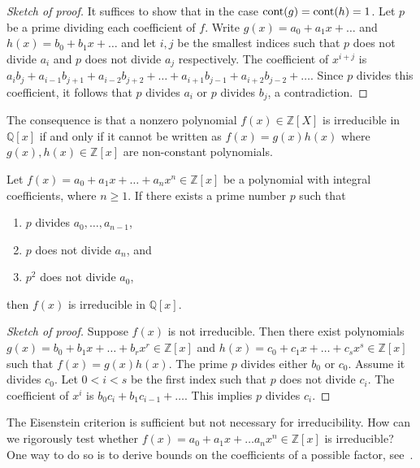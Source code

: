 \begin{proof}[Sketch of proof] 
  \small It suffices to show that in the case $\operatorname{cont}(g)  = \operatorname{cont}(h) =1$. Let $p$ be a prime dividing each coefficient of $f$. Write $g(x) = a_0 + a_1 x + \dots$ and $h(x) = b_0 + b_1 x + \dots$ and let $i,j$ be the smallest indices such that $p$ does not divide $a_i$ and $p$ does not divide $a_j$ respectively. The coefficient of $x^{i+j}$ is $a_ib_j + a_{i-1}b_{j+1} + a_{i-2}b_{j+2}+ \dots + a_{i+1}b_{j-1} + a_{i+2} b_{j-2}+ \dots$. Since $p$ divides this coefficient, it follows that $p$ divides $a_i$ or $p$ divides $b_j$, a contradiction. 
\end{proof}
The consequence is that a nonzero polynomial $f(x) ∈ ℤ[X]$ is irreducible in $ℚ[x]$ if and only if it cannot be written as $f(x) = g(x) h(x)$ where $g(x),h(x) ∈ ℤ[x]$ are non-constant polynomials.

\begin{theorem}
  Let $f(x) = a_0 + a_1 x + \dots + a_n x^n ∈ ℤ[x]$ be a polynomial with integral coefficients, where $n≥1$.  If  there exists a prime number $p$ such  that
  \begin{enumerate}[(1)]
  \item $p$ divides $a_0,\dots,a_{n-1}$,
  \item $p$ does not divide $a_n$, and
  \item $p^2$ does not divide $a_0$, 
  \end{enumerate}
  then $f(x)$ is irreducible in $ℚ[x]$.   
\end{theorem}
\begin{proof}[Sketch of proof] 
  Suppose $f(x)$ is not irreducible. Then there exist polynomials $g(x) = b_0+ b_1x + \dots + b_rx^r ∈ℤ[x]$ and $h(x) = c_0+ c_1x+ \dots + c_sx^s ∈ℤ[x]$ such that $f(x) = g(x) h(x)$. The prime $p$ divides either $b_0$ or $c_0$. Assume it divides $c_0$. Let $0<i<s$ be the first index such that $p$ does not divide $c_i$. The coefficient of $x^i$ is $b_0c_i + b_1c_{i-1}+ \dots$. This implies $p$ divides $c_i$. 
\end{proof}

The Eisenstein criterion is sufficient but not necessary for irreducibility. How can we rigorously test whether $f(x) = a_0 + a_1 x + \dots a_n x^n ∈ ℤ[x]$  is irreducible? One way to do so is to derive bounds on the coefficients of a possible factor, see~\cite{mignotte1974inequality}.

